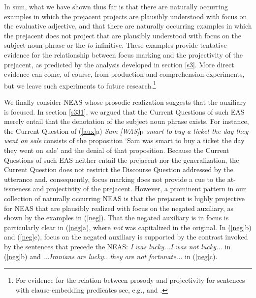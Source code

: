 \documentclass[11pt,fleqn]{article}
\newcommand{\foc}{$_{\mbox{\small F}}$}
\newcommand{\6}{\mbox{$[\hspace*{-.6mm}[$}}
\newcommand{\9}{\mbox{$]\hspace*{-.6mm}]$}}
\begin{document}
In sum, what we have shown thus far is that there are naturally occurring examples in which the prejacent projects are plausibly understood with focus on the evaluative adjective, and that there are naturally occurring examples in which the prejacent does not project that are plausibly understood with focus on the subject noun phrase or the {\em to}-infinitive. These examples provide tentative evidence for the relationship between focus marking and the projectivity of the prejacent, as predicted by the analysis developed in section \ref{s3}. More direct evidence can come, of course, from production and comprehension experiments, but we leave such experiments to future research.\footnote{For evidence for the relation between prosody and projectivity for sentences with clause-embedding predicates see, e.g., \citealt{cummins-rohde2015,tonhauser-salt26} and \citealt{djaerv-bacovcin-salt27}.} 

We finally consider NEAS whose prosodic realization suggests that the auxiliary is focused. In section \ref{s331}, we argued that the Current Questions of such EAS merely entail that the denotation of the subject noun phrase exists. For instance, the Current Question of (\ref{aux}a) {\em Sam [WAS]\foc{} smart to buy a ticket the day they went on sale} consists of the proposition `Sam was smart to buy a ticket the day they went on sale' and the denial of that proposition. Because the Current Questions of such EAS neither entail the prejacent nor the generalization, the Current Question does not restrict the Discourse Question addressed by the utterance and, consequently, focus marking does not provide a cue to the at-issueness and projectivity of the prejacent. However, a prominent pattern in our collection of naturally occurring NEAS is that the prejacent is highly projective for NEAS that are plausibly realized with focus on the negated auxiliary, as shown by the examples in (\ref{neg}). That the negated auxiliary is in focus is particularly clear in (\ref{neg}a), where {\em not} was capitalized in the original. In (\ref{neg}b) and (\ref{neg}c), focus on the negated auxiliary is supported by the contrast invoked by the sentences that precede the NEAS: {\em I was lucky...I was not lucky...} in (\ref{neg}b) and {\em ...Iranians are lucky...they are not fortunate...} in (\ref{neg}c). 
\end{document}
